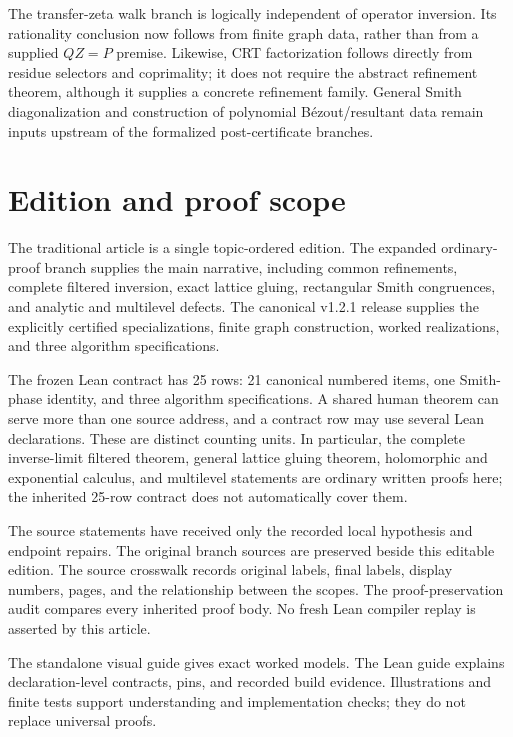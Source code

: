 \documentclass[11pt,a4paper]{article}
\theoremstyle{definition}
\theoremstyle{remark}
\theoremstyle{definition}\newtheorem{construction}[theorem]{Construction}\newtheorem{certificate}[theorem]{Numerical Certificate}
\theoremstyle{remark}\newtheorem{boundary}[theorem]{Boundary}
\begin{document}
The transfer-zeta walk branch is logically independent of operator inversion. Its
rationality conclusion now follows from finite graph data, rather than from a
supplied $QZ=P$ premise. Likewise, CRT factorization follows directly from
residue selectors and coprimality; it does not require the abstract refinement
theorem, although it supplies a concrete refinement family. General Smith
diagonalization and construction of polynomial B\'ezout/resultant data remain
inputs upstream of the formalized post-certificate branches.

\section{Edition and proof scope}\label{sec:edition-scope}
The traditional article is a single topic-ordered edition.  The expanded ordinary-proof branch supplies the main narrative, including common refinements, complete filtered inversion, exact lattice gluing, rectangular Smith congruences, and analytic and multilevel defects.  The canonical v1.2.1 release supplies the explicitly certified specializations, finite graph construction, worked realizations, and three algorithm specifications.

The frozen Lean contract has 25 rows: 21 canonical numbered items, one Smith-phase identity, and three algorithm specifications.  A shared human theorem can serve more than one source address, and a contract row may use several Lean declarations.  These are distinct counting units.  In particular, the complete inverse-limit filtered theorem, general lattice gluing theorem, holomorphic and exponential calculus, and multilevel statements are ordinary written proofs here; the inherited 25-row contract does not automatically cover them.

The source statements have received only the recorded local hypothesis and endpoint repairs.  The original branch sources are preserved beside this editable edition.  The source crosswalk records original labels, final labels, display numbers, pages, and the relationship between the scopes.  The proof-preservation audit compares every inherited proof body.  No fresh Lean compiler replay is asserted by this article.

The standalone visual guide gives exact worked models.  The Lean guide explains declaration-level contracts, pins, and recorded build evidence.  Illustrations and finite tests support understanding and implementation checks; they do not replace universal proofs.

\end{document}
